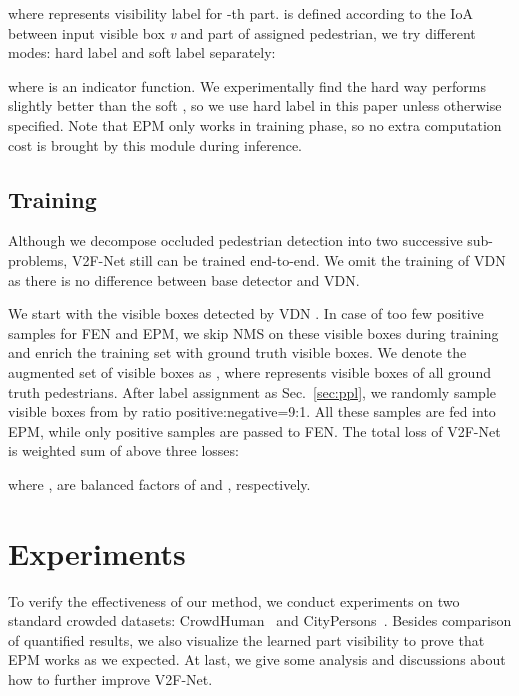 \documentclass[10pt,twocolumn,letterpaper]{article}
\begin{document}
    where  represents visibility label for -th part.  is defined according to the IoA between input visible box \textit{v} and part  of assigned pedestrian, we try different modes: hard label and soft label separately:



where  is an indicator function. We experimentally find the hard way performs slightly better than the soft , so we use hard label in this paper unless otherwise specified. Note that EPM only works in training phase, so no extra computation cost is brought by this module during inference.

\subsection{Training}
Although we decompose occluded pedestrian detection into two successive sub-problems, V2F-Net still can be trained end-to-end. We omit the training of VDN as there is no difference between base detector and VDN.

We start with the visible boxes detected by VDN . In case of too few positive samples for FEN and EPM, we skip NMS on these visible boxes during training and enrich the training set with ground truth visible boxes. We denote the augmented set of visible boxes as , where  represents visible boxes of all ground truth pedestrians. After label assignment as Sec.~\ref{sec:ppl}, we randomly sample  visible boxes from  by ratio positive:negative=9:1. All these samples are fed into EPM, while only positive samples are passed to FEN. The total loss of V2F-Net  is weighted sum of above three losses:


where ,  are balanced factors of  and , respectively.









\section{Experiments}
To verify the effectiveness of our method, we conduct experiments on two standard crowded datasets: CrowdHuman~\cite{shao2018crowdhuman} and CityPersons~\cite{zhang2017citypersons}. Besides comparison of quantified results, we also visualize the learned part visibility to prove that EPM works as we expected. At last, we give some analysis and discussions about how to further improve V2F-Net.
\end{document}
